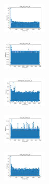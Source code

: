 \begin{figure}[H]
\begin{subfigure}
    \end{subfigure}
    \hfill
    \begin{subfigure}
        \centering
        \includegraphics[width=0.234\textwidth]{img/am01/ecoli_set_const_10_589741062_time.png}
    \end{subfigure}
    \hfill
    \begin{subfigure}
        \centering
        \includegraphics[width=0.234\textwidth]{img/am01/rand_set_const_10_589741062_time.png}
    \end{subfigure}
    \hfill
    \begin{subfigure}
        \centering
        \includegraphics[width=0.234\textwidth]{img/am01/newthyroid_set_const_10_589741062_time.png}
    \end{subfigure}
    \hfill
    \begin{subfigure}
        \centering
        \includegraphics[width=0.234\textwidth]{img/am01/iris_set_const_10_277451237_time.png}
    \end{subfigure}
    \hfill
    \begin{subfigure}
        \centering
        \includegraphics[width=0.234\textwidth]{img/am01/ecoli_set_const_10_277451237_time.png}
    \end{subfigure}
    \hfill
    \begin{subfigure}

\end{subfigure}
\end{figure}
